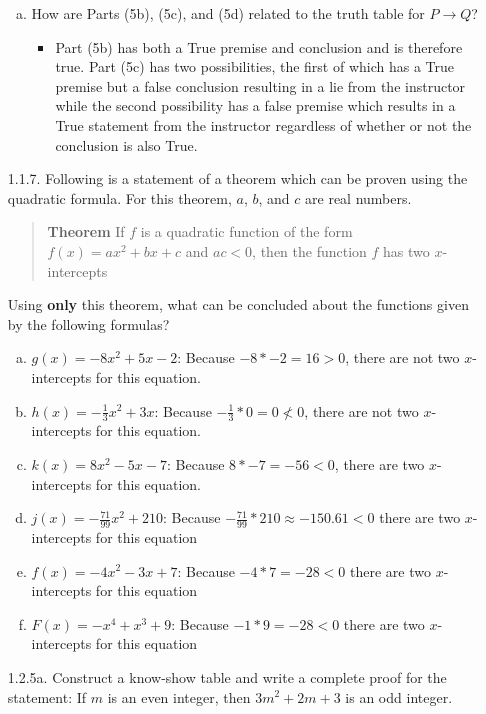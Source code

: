 \documentclass[12pt]{article}
\newcommand{\ds}{\displaystyle}
\begin{document}
\begin{itemize}
\begin{enumerate}[(a)]
\item How are Parts (5b), (5c), and (5d) related to the truth table for $P\to Q$?
    \begin{itemize}
        \item Part (5b) has both a True premise and conclusion and is therefore true. Part (5c) has two possibilities, the first of which has a True premise but a false conclusion resulting in a lie from the instructor while the second possibility has a false premise which results in a True statement from the instructor regardless of whether or not the conclusion is also True.
    \end{itemize}
\end{enumerate}

\hrulefill

\item[1.1.7.] Following is a statement of a theorem which can be proven using the quadratic formula. For this theorem, $a$, $b$, and $c$ are real numbers.
\begin{quote}
{\bf Theorem} If $f$ is a quadratic function of the form $f(x)=ax^2+bx+c$ and $ac<0$, then the function $f$ has two $x$-intercepts
\end{quote}
Using {\bf only} this theorem, what can be concluded about the functions given by the following formulas?


\begin{enumerate}[(a)]
\item $g(x)=-8x^2+5x-2$: Because $-8*-2=16>0$, there are not two $x$-intercepts for this equation.
\item $\ds h(x)=-\frac{1}{3}x^2+3x$: Because $-\frac{1}{3}*0=0 \nless 0$, there are not two $x$-intercepts for this equation.
\item $k(x)=8x^2-5x-7$: Because $8 * -7 = -56 < 0$, there are two $x$-intercepts for this equation.
\item $\ds j(x)=-\frac{71}{99}x^2+210$: Because $-\frac{71}{99}*210 \approx -150.61 < 0 $ there are two $x$-intercepts for this equation
\item $f(x)=-4x^2-3x+7$: Because $-4*7 = -28 < 0 $ there are two $x$-intercepts for this equation
\item $F(x)=-x^4+x^3+9$: Because $-1*9 = -28 < 0 $ there are two $x$-intercepts for this equation
\end{enumerate}


\hrulefill

\item[1.2.5a.] Construct a know-show table and write a complete proof for the statement: If $m$ is an even integer, then $3m^2+2m+3$ is an odd integer.


\end{itemize}
\end{document}
